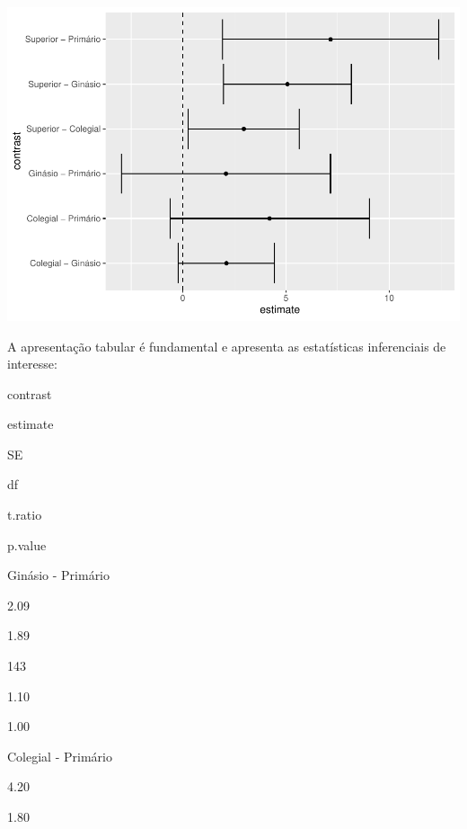 \documentclass[
]{book}
\newenvironment{Shaded}{\begin{snugshade}}{\end{snugshade}}
\newcommand{\DataTypeTok}[1]{\textcolor[rgb]{0.13,0.29,0.53}{#1}}
\newcommand{\DecValTok}[1]{\textcolor[rgb]{0.00,0.00,0.81}{#1}}
\newcommand{\KeywordTok}[1]{\textcolor[rgb]{0.13,0.29,0.53}{\textbf{#1}}}
\newcommand{\NormalTok}[1]{#1}
\newcommand{\OperatorTok}[1]{\textcolor[rgb]{0.81,0.36,0.00}{\textbf{#1}}}
\newcommand{\StringTok}[1]{\textcolor[rgb]{0.31,0.60,0.02}{#1}}
\begin{document}
\begin{center}\includegraphics{gitbook-demo_files/figure-latex/unnamed-chunk-61-1} \end{center}

A apresentação tabular é fundamental e apresenta as estatísticas inferenciais de interesse:

\begin{Shaded}
\end{Shaded}

contrast

estimate

SE

df

t.ratio

p.value

Ginásio - Primário

2.09

1.89

143

1.10

1.00

Colegial - Primário

4.20

1.80
\end{document}
